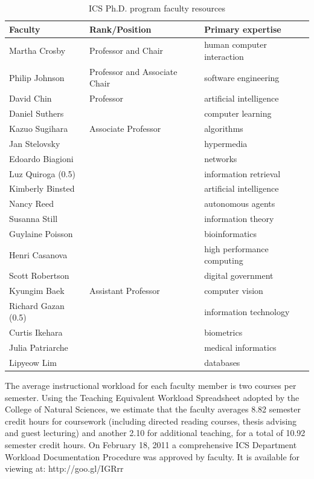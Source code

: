 \documentclass[12pt]{article}
\begin{document}
\begin{table}[htbp]
\begin{center}
\caption{ICS Ph.D. program faculty resources}
\label{fig:faculty}
\begin{tabular}{|l|l|l|} \hline
{\bf Faculty} & {\bf Rank/Position} & {\bf Primary expertise} \\ \hline
Martha Crosby & Professor and Chair & human computer interaction \\ \hline
Philip Johnson & Professor and Associate Chair & software engineering \\ \hline
David Chin & Professor & artificial intelligence \\
Daniel Suthers &  & computer learning  \\ \hline
Kazuo Sugihara & Associate Professor & algorithms   \\
Jan Stelovsky &                      & hypermedia    \\
Edoardo Biagioni &                   & networks   \\
Luz Quiroga (0.5) &                  & information retrieval   \\
Kimberly Binsted &                   & artificial intelligence   \\
Nancy Reed	 &                   & autonomous agents   \\
Susanna Still &                      & information theory   \\
Guylaine Poisson &                   & bioinformatics   \\
Henri Casanova &                     & high performance computing   \\
Scott Robertson &                    & digital government   \\ \hline
Kyungim Baek &   Assistant Professor & computer vision   \\
Richard Gazan (0.5) &                & information technology   \\
Curtis Ikehara	&                    & biometrics   \\
Julia Patriarche &                   & medical informatics   \\
Lipyeow Lim	&                    & databases   \\ \hline
\end{tabular}
\end{center}
\end{table}

The average instructional workload for each faculty member is two courses
per semester. Using the Teaching Equivalent Workload Spreadsheet adopted by
the College of Natural Sciences, we estimate that the faculty averages 8.82
semester credit hours for coursework (including directed reading courses,
thesis advising and guest lecturing) and another 2.10 for additional
teaching, for a total of 10.92 semester credit hours. On February 18, 2011
a comprehensive ICS Department Workload Documentation Procedure was
approved by faculty. It is available for viewing at: http://goo.gl/IGRrr
\end{document}

